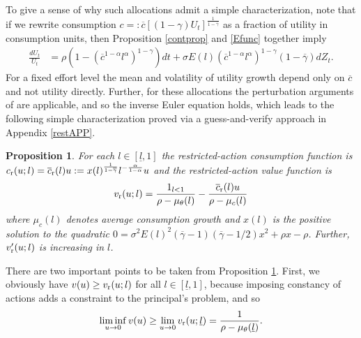 \documentclass[11pt]{article}
\theoremstyle{plain}
\newtheorem{prop}[thm]{Proposition}
\begin{document}
To give a sense of why such allocations admit a simple characterization, note that if we rewrite consumption $c =: \overline{c}[(1-\gamma)U_t]^{\frac{1}{1-\overline{\gamma}}}$ as a fraction of utility in consumption units, then Proposition \ref{contprop} and \eqref{Efunc} together imply
\begin{align*}
\frac{dU_t}{U_t} & = \rho{\left(1-(\overline{c}^{1-\alpha}l^{\alpha})^{1-\gamma}\right)}dt + \sigma E(l)(\overline{c}^{1-\alpha}l^{\alpha})^{1-\gamma}(1-\overline{\gamma})dZ_t.
\end{align*} 
For a fixed effort level the mean and volatility of utility growth depend only on $\overline{c}$ and not utility directly. Further, for these allocations the perturbation arguments of \cite{golosov_optimal_2003} are applicable, and so the inverse Euler equation holds, which leads to the following simple characterization proved via a guess-and-verify approach in Appendix \ref{restAPP}.
\begin{prop}\label{propREST} 
For each $l \in [\underline{l},1]$ the restricted-action consumption function is $c_{\textnormal{r}}(u;l) = \overline{c}_{\textnormal{r}}(l) u := x(l)^{\frac{1}{1-\overline{\gamma}}}l^{-\frac{\alpha }{1-\alpha}}u$ and the restricted-action value function is
$$
v_{\textnormal{r}}(u;l) = \frac{1_{l<1}}{\rho - \mu_{\theta}(l)} - \frac{\overline{c}_{\textnormal{r}}(l) u}{\rho - \mu_c(l)}
$$
where $\mu_c(l)$ denotes average consumption growth and $x(l)$ is the positive solution to the quadratic $0 = \sigma^2E(l)^2(\overline{\gamma}-1)(\overline{\gamma}-1/2)x^2 + \rho x - \rho$. Further, $v_{\textnormal{r}}'(u;l)$ is increasing in $l$. 
\end{prop} 
There are two important points to be taken from Proposition \ref{propREST}. First, we obviously have $v(u) \geq v_{\textnormal{r}}(u;l)$ for all $l \in [\underline{l},1]$, because imposing constancy of actions adds a constraint to the principal's problem, and so 
\begin{equation}
\liminf_{u \rightarrow 0} v(u) \geq \lim_{u \rightarrow 0} v_{\textnormal{r}}(u;\underline{l}) = \frac{1}{\rho - \mu_{\theta}(\underline{l})}.
\label{high_eff_zero}
\end{equation}
\end{document}
